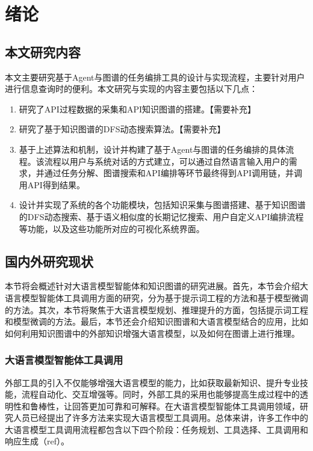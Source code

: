 
\chapter{绪论}

\section{本文研究内容}
本文主要研究基于Agent与图谱的任务编排工具的设计与实现流程，主要针对用户进行信息查询时的便利。本文研究与实现的内容主要包括以下几点：

\begin{enumerate}
    \item 研究了API过程数据的采集和API知识图谱的搭建。【需要补充】
    \item 研究了基于知识图谱的DFS动态搜索算法。【需要补充】
    \item 基于上述算法和机制，设计并构建了基于Agent与图谱的任务编排的具体流程。该流程以用户与系统对话的方式建立，可以通过自然语言输入用户的需求，并通过任务分解、图谱搜索和API编排等环节最终得到API调用链，并调用API得到结果。
    \item 设计并实现了系统的各个功能模块，包括知识采集与图谱搭建、基于知识图谱的DFS动态搜索、基于语义相似度的长期记忆搜索、用户自定义API编排流程等功能，以及这些功能所对应的可视化系统界面。
\end{enumerate}

\section{国内外研究现状}
本节将会概述针对大语言模型智能体和知识图谱的研究进展。首先，本节会介绍大语言模型智能体工具调用方面的研究，分为基于提示词工程的方法和基于模型微调的方法。其次，本节将聚焦于大语言模型规划、推理提升的方面，包括提示词工程和模型微调的方法。最后，本节还会介绍知识图谱和大语言模型结合的应用，比如如何利用知识图谱中的外部知识增强大语言模型，以及如何在图谱上进行推理。

\subsection{大语言模型智能体工具调用}

外部工具的引入不仅能够增强大语言模型的能力，比如获取最新知识、提升专业技能，流程自动化、交互增强等。同时，外部工具的采用也能够提高生成过程中的透明性和鲁棒性，让回答更加可靠和可解释。在大语言模型智能体工具调用领域，研究人员已经提出了许多方法来实现大语言模型工具调用。总体来讲，许多工作中的大语言模型工具调用流程都包含以下四个阶段：任务规划、工具选择、工具调用和响应生成（ref）。

